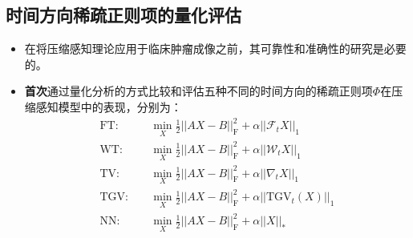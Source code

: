\documentclass{beamer}
\begin{document}
\subsection{时间方向稀疏正则项的量化评估}
\begin{frame}
	\begin{itemize}
		\item 在将压缩感知理论应用于临床肿瘤成像之前，其可靠性和准确性的研究是必要的。
		\item \textbf{首次}通过量化分析的方式比较和评估五种不同的时间方向的稀疏正则项$\Phi$在压缩感知模型中的表现，分别为：
		\begin{equation}
		\begin{aligned}
	 \mathrm{FT}:\quad &\min_X\frac{1}{2}||AX-B||_{\mathrm{F}}^2 + \alpha||\mathcal{F}_tX||_1 \\
	 \mathrm{WT}:\quad &\min_X\frac{1}{2}||AX-B||_{\mathrm{F}}^2 + \alpha||\mathcal{W}_tX||_1 \\
	 \mathrm{TV}:\quad &\min_X\frac{1}{2}||AX-B||_{\mathrm{F}}^2 + \alpha||\nabla_t X||_1 \\
	 \mathrm{TGV}:\quad &\min_X\frac{1}{2}||AX-B||_{\mathrm{F}}^2 + \alpha||\mathrm{TGV}_t(X)||_1 \\
	 \mathrm{NN}:\quad &\min_X\frac{1}{2}||AX-B||_{\mathrm{F}}^2 + \alpha||X||_*
\end{aligned}
\end{equation}
	\end{itemize}
\end{frame}


\end{document}
